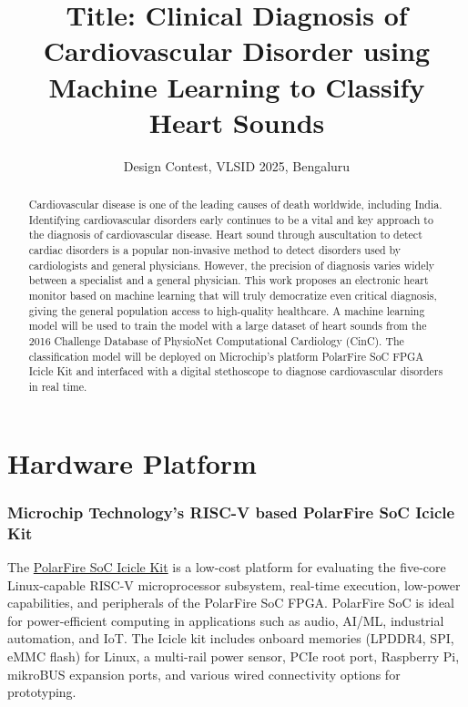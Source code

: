 \documentclass[12pt]{article}
\title{Title: Clinical Diagnosis of Cardiovascular Disorder using Machine Learning to Classify Heart Sounds }
\author{Design Contest, VLSID 2025, Bengaluru}
\begin{document}
\maketitle

\begin{abstract}
Cardiovascular disease is one of the leading causes of death worldwide, including India. Identifying cardiovascular disorders early continues to be a vital and key approach to the diagnosis of cardiovascular disease. 
Heart sound through auscultation to detect cardiac disorders is a popular non-invasive method to detect disorders used by cardiologists and general physicians. However, the precision of diagnosis varies widely between a specialist and a general physician. 
This work proposes an electronic heart monitor based on machine learning that will truly democratize even critical diagnosis, giving the general population access to high-quality healthcare. A machine learning model will be used to train the model with a large dataset of heart sounds from the 2016 Challenge Database of PhysioNet Computational Cardiology (CinC). The classification model will be deployed on Microchip’s platform PolarFire SoC FPGA Icicle Kit and interfaced with a digital stethoscope to diagnose cardiovascular disorders in real time.
\end{abstract}


\section{Hardware Platform}

\subsubsection*{Microchip Technology’s RISC-V based PolarFire SoC Icicle Kit}

The \href{https://www.microchip.com/en-us/development-tool/mpfs-icicle-kit-es}{PolarFire SoC Icicle Kit} is a low-cost platform for evaluating the five-core Linux-capable RISC-V microprocessor subsystem, real-time execution, low-power capabilities, and peripherals of the PolarFire SoC FPGA. PolarFire SoC is ideal for power-efficient computing in applications such as audio, AI/ML, industrial automation, and IoT. The Icicle kit includes onboard memories (LPDDR4, SPI, eMMC flash) for Linux, a multi-rail power sensor, PCIe root port, Raspberry Pi, mikroBUS expansion ports, and various wired connectivity options for prototyping.
\end{document}
